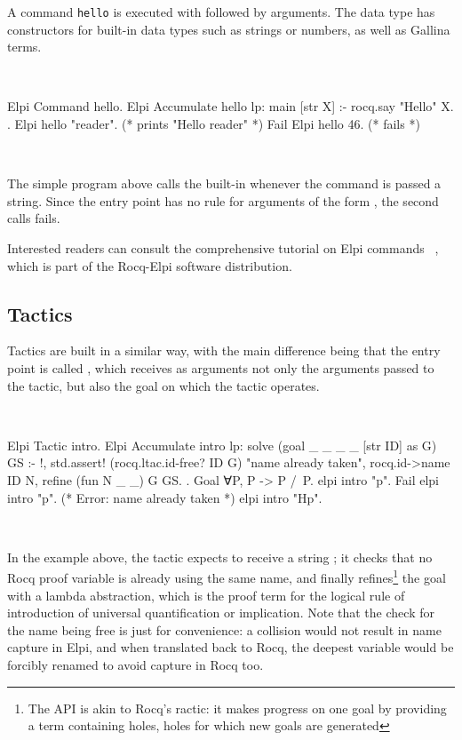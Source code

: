 \documentclass[a4paper, 11pt]{book}
\newenvironment{rocqcode}
  {\VerbatimEnvironment~\\\begin{rocqbox}\begin{xrocqcode}}{\end{xrocqcode}
\end{rocqbox}\\}
\begin{document}
A command \texttt{hello} is executed with  followed by
arguments. The  data type has constructors for built-in data
types such as strings or numbers, as well as Gallina terms.

\begin{rocqcode}
Elpi Command hello.
Elpi Accumulate hello lp:{{
  main [str X] :- rocq.say "Hello" X.
}}.
Elpi hello "reader".    (* prints "Hello reader" *)
Fail Elpi hello 46.     (* fails *)
\end{rocqcode}

The simple program above calls the  built-in whenever the
command is passed a string. Since the entry point  has no rule for
arguments of the form , the second calls fails.

Interested readers can consult the comprehensive tutorial on Elpi commands
~\cite{tuto:commands}, which is part of the Rocq-Elpi software distribution.

\subsection{Tactics}


Tactics are built in a similar way, with the main difference being that the
entry point is called , which receives as arguments not only the
arguments passed to the tactic, but also the goal on which the tactic
operates.

\begin{rocqcode}
Elpi Tactic intro.
Elpi Accumulate intro lp:{{
  solve (goal _ _ _ _ [str ID] as G) GS :- !,
    std.assert! (rocq.ltac.id-free? ID G) "name already taken",
    rocq.id->name ID N,
    refine (fun N _ _) G GS.
}}.
Goal ∀P, P -> P /\ P.
elpi intro "p".
Fail elpi intro "p". (* Error: name already taken *)
elpi intro "Hp".
\end{rocqcode}


In the example above, the tactic expects to receive a string ; it
checks that no Rocq proof variable is already using the same name, and finally
refines\footnote{The  API is akin to Rocq's 
ractic: it makes progress on one goal by
providing a term containing holes, holes for which new goals are generated}
the goal with a lambda abstraction, which is the proof term for the
logical rule of introduction of universal quantification or implication.
Note that the check for the name being free is just for convenience: a
collision would not result in name capture in Elpi, and when translated back
to Rocq, the deepest variable would be forcibly renamed to avoid capture in Rocq too.
\end{document}
